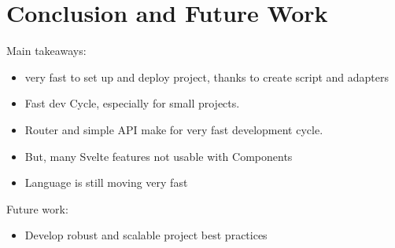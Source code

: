 \chapter{Conclusion and Future Work}
\label{ch:conclusion}


Main takeaways:
\begin{itemize}
  \item very fast to set up and deploy project, thanks to create script and adapters
  \item Fast dev Cycle, especially for small projects. 
  \item Router and simple API make for very fast development cycle.
  \item But, many Svelte features not usable with Components
  \item Language is still moving very fast
\end{itemize}

Future work:
\begin{itemize}
  \item Develop robust and scalable project best practices
\end{itemize}